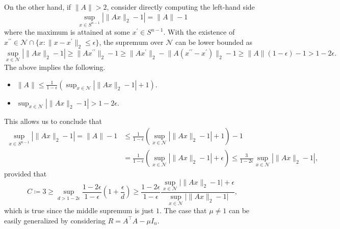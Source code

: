 \begin{answer}
	On the other hand, if \(\lVert A \rVert > 2\), consider directly computing the left-hand side
	\[
		\sup _{x \in S^{n-1}} \left\lvert \lVert Ax \rVert _2 - 1 \right\rvert
		= \lVert A \rVert - 1
	\]
	where the maximum is attained at some \(x^{\prime} \in S^{n-1}\). With the existence of \(x^{\prime\prime} \in \mathcal{N} \cap \{ x \colon \lVert x - x^{\prime}  \rVert _2 \leq \epsilon  \} \), the supremum over \(\mathcal{N} \) can be lower bounded as
	\[
		\sup _{x \in \mathcal{N} }\left\lvert \lVert Ax \rVert _2 - 1 \right\rvert
		\geq \lVert A x^{\prime\prime}  \rVert _2 - 1
		\geq \lVert A x^{\prime}  \rVert _2 - \lVert A(x^{\prime\prime} - x^{\prime} ) \rVert _2 - 1
		\geq \lVert A \rVert (1 - \epsilon ) - 1
		> 1 - 2\epsilon .
	\]
	The above implies the following.
	\begin{itemize}
		\item \(\lVert A \rVert \leq \frac{1}{1 - \epsilon } (\sup _{x \in \mathcal{N} }\left\lvert \lVert Ax \rVert _2 - 1 \right\rvert + 1)\).
		\item \(\sup _{x \in \mathcal{N} }\left\lvert \lVert Ax \rVert _2 - 1 \right\rvert > 1 - 2\epsilon \).
	\end{itemize}
	This allows us to conclude that
	\[
		\begin{split}
			\sup _{x \in S^{n-1}} \left\lvert \lVert Ax \rVert _2 - 1 \right\rvert
			= \lVert A \rVert - 1
			 & \leq \frac{1}{1 - \epsilon } \left( \sup _{x \in \mathcal{N} } \left\lvert \lVert Ax \rVert _2 - 1 \right\rvert + 1 \right) - 1 \\
			 & = \frac{1}{1 - \epsilon } \left( \sup _{x \in \mathcal{N} } \left\lvert \lVert Ax \rVert _2 - 1 \right\rvert + \epsilon \right)
			\leq \frac{3}{1 - 2\epsilon } \sup _{x \in \mathcal{N} } \left\lvert \lVert Ax \rVert _2 - 1 \right\rvert ,
		\end{split}
	\]
	provided that
	\[
		C
		\coloneqq 3
		\geq \sup _{d > 1 - 2\epsilon } \frac{1 - 2\epsilon }{1 - \epsilon } \left( 1 + \frac{\epsilon }{d} \right)
		\geq \frac{1 - 2\epsilon }{1 - \epsilon } \frac{\sup _{x \in \mathcal{N} } \lvert \lVert Ax \rVert _2 - 1 \rvert + \epsilon }{\sup _{x \in \mathcal{N} } \lvert \lVert Ax \rVert _2 - 1 \rvert },
	\]
	which is true since the middle supremum is just \(1\). The case that \(\mu \neq 1\) can be easily generalized by considering \(R = A^{\top} A - \mu I_n\).
\end{answer}


